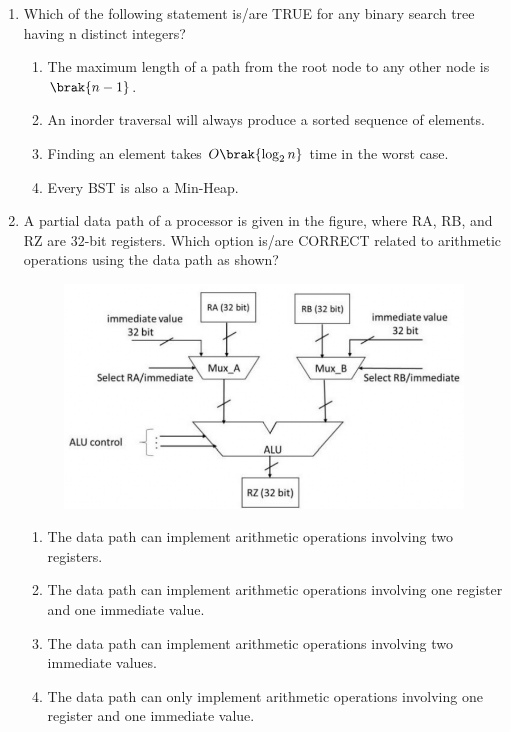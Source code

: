 \documentclass[a4paper, 11pt]{article}
\begin{document}
\begin{enumerate}
    \hfill{}

    \item Which of the following statement is/are TRUE for any binary search tree  having n distinct integers?
    \begin{enumerate}
        \item The maximum length of a path from the root node to any other node is $\brak{n-1}$.
        \item An inorder traversal will always produce a sorted sequence of elements.
        \item Finding an element takes $O\brak{\log_2 n}$ time in the worst case.
        \item Every BST is also a Min-Heap.
    \end{enumerate}

    \hfill{}

    \item A partial data path of a processor is given in the figure, where RA, RB, and RZ are $32$-bit registers. Which option is/are CORRECT related to arithmetic operations using the data path as shown?
    
    \begin{figure}[H]
        \centering
        \includegraphics[width=0.8\columnwidth]{figs/q27.png}
        \label{fig:q27}
    \end{figure}
    
    \begin{enumerate}
        \item The data path can implement arithmetic operations involving two registers.
        \item The data path can implement arithmetic operations involving one register and one immediate value.
        \item The data path can implement arithmetic operations involving two immediate values.
        \item The data path can only implement arithmetic operations involving one register and one immediate value.
    \end{enumerate}


\end{enumerate}
\end{document}

